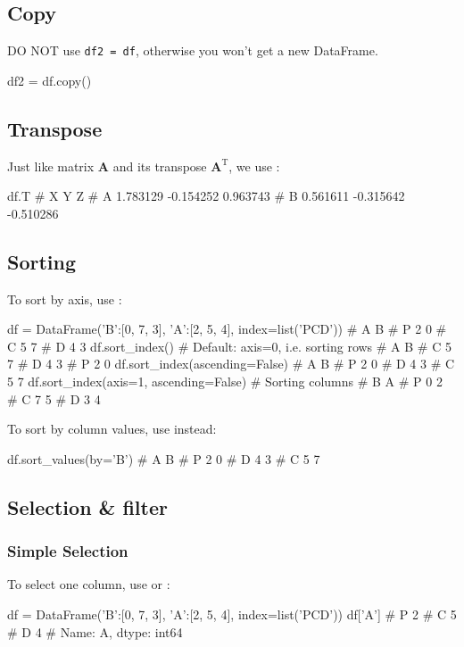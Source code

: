 \documentclass{report}
\begin{document}
\subsection{Copy}
DO NOT use \texttt{df2 = df}, otherwise you won't get a new DataFrame.
\begin{py}
df2 = df.copy()
\end{py}

\subsection{Transpose}
Just like matrix $\boldsymbol{A}$ and its transpose $\boldsymbol{A}^{\mathrm{T}}$, we use : 
\begin{py}
df.T
#           X         Y         Z
# A  1.783129 -0.154252  0.963743
# B  0.561611 -0.315642 -0.510286
\end{py}

\subsection{Sorting}
To sort by axis, use :
\begin{py}
df = DataFrame({'B':[0, 7, 3], 'A':[2, 5, 4]}, index=list('PCD'))
#    A  B
# P  2  0
# C  5  7
# D  4  3
df.sort_index()  # Default: axis=0, i.e. sorting rows
#    A  B
# C  5  7
# D  4  3
# P  2  0
df.sort_index(ascending=False)
#    A  B
# P  2  0
# D  4  3
# C  5  7
df.sort_index(axis=1, ascending=False) # Sorting columns
#    B  A
# P  0  2
# C  7  5
# D  3  4
\end{py}

To sort by column values, use  instead:
\begin{py}
df.sort_values(by='B')
#    A  B
# P  2  0
# D  4  3
# C  5  7
\end{py}

\subsection{Selection \& filter}
\subsubsection{Simple Selection}
To select one column, use  or : 
\begin{py}
df = DataFrame({'B':[0, 7, 3], 'A':[2, 5, 4]}, index=list('PCD'))
df['A']
# P    2
# C    5
# D    4
# Name: A, dtype: int64
\end{py}
\end{document}
